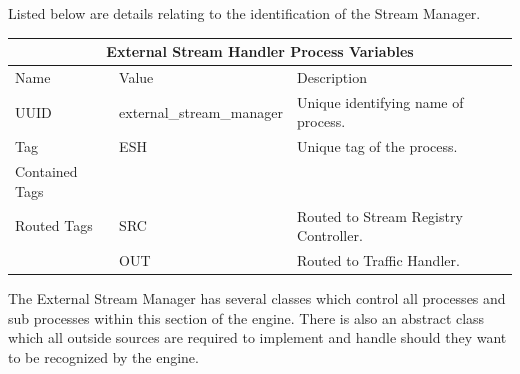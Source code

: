 \documentclass{article}
\begin{document}
Listed below are details relating to the identification of the Stream Manager.

\begin{center}
\begin{tabular}{ | p{5cm} || p{4cm} | p{6cm} | }
\hline
\multicolumn{3}{|c|}{External Stream Handler Process Variables}\\
\hline
Name & Value & Description\\
\hline
UUID & external\_stream\_manager & Unique identifying name of process.\\
\hline
Tag & ESH & Unique tag of the process.\\
\hline
Contained Tags & & \\
\hline
Routed Tags & SRC & Routed to Stream Registry Controller.\\
 & OUT & Routed to Traffic Handler.\\
\hline
\end{tabular}
\end{center}

The External Stream Manager has several classes which control all processes and sub processes within this section of the engine. There is also an abstract class which all outside sources are required to implement and handle should they want to be recognized by the engine.
\end{document}

